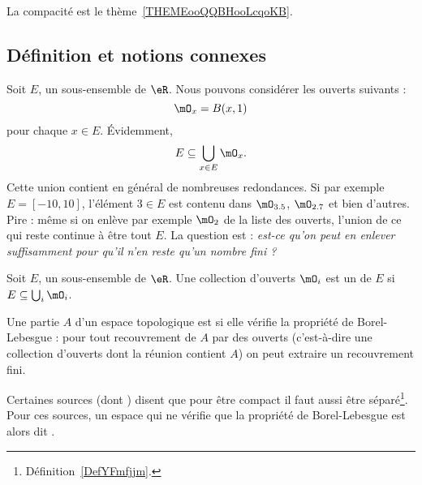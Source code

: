 La compacité est le thème~\ref{THEMEooQQBHooLcqoKB}.

\subsection{Définition et notions connexes}

Soit \( E\), un sous-ensemble de \( \eR\). Nous pouvons considérer les ouverts suivants :
\begin{equation}
	\mO_x=B(x,1)
\end{equation}
pour chaque \( x\in E\). Évidemment,
\begin{equation}
	E\subseteq \bigcup_{x\in E}\mO_x.
\end{equation}
Cette union contient en général de nombreuses redondances. Si par exemple \( E=[-10,10]\), l'élément \( 3\in E\) est contenu dans \( \mO_{3.5}\), \( \mO_{2.7}\) et bien d'autres. Pire : même si on enlève par exemple \( \mO_2\) de la liste des ouverts, l'union de ce qui reste continue à être tout \( E\). La question est : \emph{est-ce qu'on peut en enlever suffisamment pour qu'il n'en reste qu'un nombre fini ?}

\begin{definition}
	Soit \( E\), un sous-ensemble de \( \eR\). Une collection d'ouverts \( \mO_i\) est un  de \( E\) si \( E\subseteq \bigcup_{i}\mO_i\).
\end{definition}

\begin{definition} \label{DefJJVsEqs}
	Une partie \( A\) d'un espace topologique est  si elle vérifie la propriété de Borel-Lebesgue : pour tout recouvrement de \( A\) par des ouverts (c'est-à-dire une collection d'ouverts dont la réunion contient \( A\)) on peut extraire un recouvrement fini.
\end{definition}

\begin{remark}
	Certaines sources (dont ) disent que pour être compact il faut aussi être séparé\footnote{Définition~\ref{DefYFmfjjm}.}. Pour ces sources, un espace qui ne vérifie que la propriété de Borel-Lebesgue est alors dit .
\end{remark}

